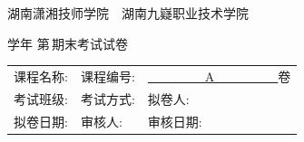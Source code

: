 \documentclass[12pt,twocolumn,landscape,UTF8,twoside]{ctexart}
\author{高星}
\begin{document}
	\noindent	
	
	\begin{spacing}{1.2}
		\begin{center}
			 \heiti 
			湖南潇湘技师学院~~湖南九嶷职业技术学院
			
			\uline{}学年 \hspace{0.5cm} 第\,\uline{}期末考试试卷	
			
			 \songti \vspace{5mm}
			\begin{tabu} to 0.45\textwidth {X[1.3,l]X[1,l]X[0.8,l]}
				
				课程名称:  \uline{}&
				课程编号:\uline{\makebox[20mm][c]{~}} &
				\uline{~~~~~~~~~A~~~~~~~~~~}卷\\ 
				
				考试班级: \uline{}& 
				考试方式:\uline{}& 	
				拟卷人:\uline{ } \\ 
				
				拟卷日期:\uline{}& 
				审核人:\uline{\makebox[25mm][c]{}} & 	
				审核日期:\uline{\makebox[15mm][c]{}} \\ 
			\end{tabu}  
			
			
			 \songti \vspace{5mm}
		\end{center}
	\end{spacing}
	
	\vspace{-8pt} 
\end{document}
